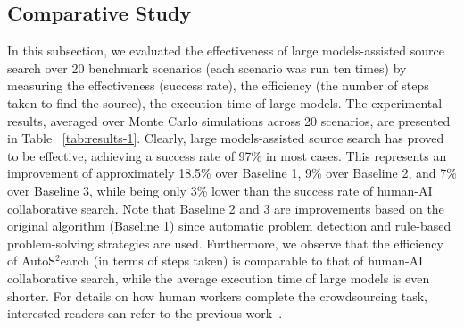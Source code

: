 \subsection{Comparative Study} %

In this subsection, we evaluated the effectiveness of large models-assisted source search over 20  benchmark scenarios (each scenario was run ten times) by measuring the effectiveness (success rate), the efficiency (the number of steps taken to find the source), the execution time of large models. The experimental results, averaged over Monte Carlo simulations across 20 scenarios, are presented in Table ~\ref{tab:results-1}. Clearly, large models-assisted source search has proved to be effective, achieving a success rate of 97\% in most cases. This represents an improvement of approximately 18.5\% over Baseline 1, 9\% over Baseline 2, and 7\% over Baseline 3, while being only 3\% lower than the success rate of human-AI collaborative search. Note that Baseline 2 and 3 are improvements based on the original algorithm (Baseline 1) since automatic problem detection and rule-based problem-solving strategies are used. Furthermore, we observe that the efficiency of AutoS$^2$earch (in terms of steps taken) is comparable to that of human-AI collaborative search, while the average execution time of large models is even shorter. For details on how human workers complete the crowdsourcing task, interested readers can refer to the previous work~\cite{zhao2022crowd}.

\begin{table}[!ht]
    \centering
    \caption{Results of the comparisons over various baselines.}
    \label{tab:results-1}
\end{table}

